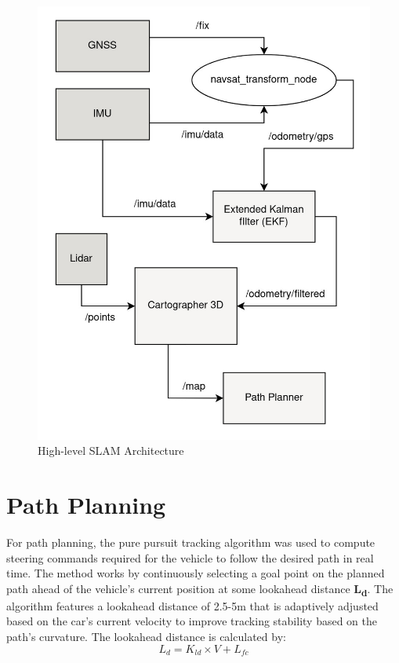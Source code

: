 \documentclass[conference]{IEEEtran}
\begin{document}
\begin{figure}[htbp]
\centerline{\includegraphics[scale=0.2]{images/SLAM.jpeg}}
\caption{High-level SLAM Architecture}
\label{fig}
\end{figure}

\section{Path Planning}
For path planning, the pure pursuit tracking algorithm \cite{b16} was used to compute steering commands required for the vehicle to follow the desired path in real time. The method works by continuously selecting a goal point on the planned path ahead of the vehicle's current position at some lookahead distance \textbf{L\textsubscript{d}}. The algorithm features a lookahead distance of 2.5-5m that is adaptively adjusted based on the car's current velocity to improve tracking stability based on the path's curvature. The lookahead distance is calculated by:
\begin{equation}
L_d = K_{ld} \times V + L_{fc}
\end{equation}
\end{document}
